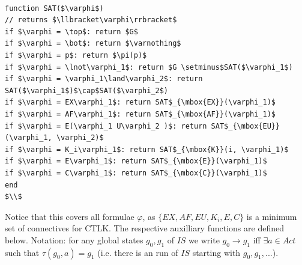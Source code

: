 \documentclass[11pt]{article}
\begin{document}
\begin{lstlisting}[mathescape]

function SAT($\varphi$) 
// returns $\llbracket\varphi\rrbracket$
if $\varphi = \top$: return $G$
if $\varphi = \bot$: return $\varnothing$
if $\varphi = p$: return $\pi(p)$ 
if $\varphi = \lnot\varphi_1$: return $G \setminus$SAT($\varphi_1$)
if $\varphi = \varphi_1\land\varphi_2$: return SAT($\varphi_1$)$\cap$SAT($\varphi_2$)
if $\varphi = EX\varphi_1$: return SAT$_{\mbox{EX}}(\varphi_1)$
if $\varphi = AF\varphi_1$: return SAT$_{\mbox{AF}}(\varphi_1)$
if $\varphi = E(\varphi_1 U\varphi_2 )$: return SAT$_{\mbox{EU}}(\varphi_1, \varphi_2)$
if $\varphi = K_i\varphi_1$: return SAT$_{\mbox{K}}(i, \varphi_1)$
if $\varphi = E\varphi_1$: return SAT$_{\mbox{E}}(\varphi_1)$
if $\varphi = C\varphi_1$: return SAT$_{\mbox{C}}(\varphi_1)$
end
$\\$
\end{lstlisting}

Notice that this covers all formulae $\varphi$, as $\{EX, AF, EU, K_i, E, C\}$ is a minimum set of connectives for CTLK. The respective auxilliary functions are defined below. Notation: for any global states $g_0, g_1$ of $IS$ we write $g_0 \rightarrow g_1$ iff $\exists a \in Act$ such that $\tau(g_0, a) = g_1$ (i.e. there is an run of $IS$ starting with $g_0, g_1, ...$).
\end{document}
